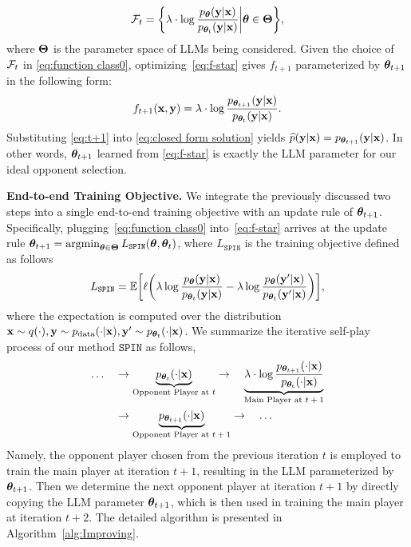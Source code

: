 \documentclass{article}
\newcommand{\method}{\texttt{SPIN}}
\begin{document}
\begin{align}
\mathcal{F}_{t} = \bigg\{\lambda\cdot \log \frac{p_{\bm{\theta}}(\mathbf{y} | \mathbf{x})}{p_{\mathrm{\bm{\theta}_t}}(\mathbf{y} | \mathbf{x})}\bigg|\bm{\theta} \in \bm{\Theta}\bigg\},   \label{eq:function class0} 
\end{align}
where $\bm{\Theta}$ is the parameter space of LLMs being considered. 
Given the choice of $\mathcal{F}_t$ in \eqref{eq:function class0}, optimizing~\eqref{eq:f-star} gives $f_{t+1}$ parameterized by $\bm{\theta}_{t+1}$ in the following form:
\begin{align}
f_{t+1}(\mathbf{x}, \mathbf{y}) = \lambda\cdot \log \frac{p_{\bm{\theta}_{t+1}}(\mathbf{y} | \mathbf{x})}{p_{\mathrm{\bm{\theta}_{t}}}(\mathbf{y} | \mathbf{x})}.    \label{eq:t+1}
\end{align}
Substituting \eqref{eq:t+1} into \eqref{eq:closed form solution} yields $\widehat{p}(\mathbf{y}|\mathbf{x}) = p_{\bm{\theta}_{t+1}}(\mathbf{y}|\mathbf{x})$. 
In other words, $\bm{\theta}_{t+1}$ learned from \eqref{eq:f-star} is exactly the LLM parameter for our ideal opponent selection. 




\noindent \textbf{End-to-end Training Objective.} 
We integrate the previously discussed two steps into a single end-to-end training objective with an update rule of $\bm{\theta}_{t+1}$. Specifically, plugging~\eqref{eq:function class0} into~\eqref{eq:f-star} arrives at the update rule $\btheta_{t+1} = \argmin_{\btheta \in \bTheta}L_{\method}(\btheta, \btheta_t)$, where $L_{\method}$ is the training objective defined as follows
\begin{align}
L_{\method}= \EE\bigg[\ell\bigg(\lambda \log \frac{p_{\btheta}(\yb | \xb)}{p_{\btheta_t}(\yb | \xb)}-\lambda \log \frac{p_{\btheta}(\yb' | \xb)}{p_{\btheta_t}(\yb' | \xb)}\bigg)\bigg], \label{eq:loss}  
\end{align}
where the expectation is computed over the distribution $\mathbf{x} \sim q(\cdot), \mathbf{y} \sim p_{\mathrm{data}}(\cdot|\mathbf{x}), \mathbf{y}' \sim p_{\bm{\theta}_t}(\cdot|\mathbf{x})$.
We summarize the iterative self-play process of our method $\method$ as follows, 
\begin{align*}
\ldots &\quad  \rightarrow  \underbrace{p_{\bm{\theta}_{t}}(\cdot | \mathbf{x})}_{\text{Opponent Player at $t$}} \rightarrow  \quad \underbrace{\lambda\cdot \log \frac{p_{\bm{\theta}_{t+1}}(\cdot | \mathbf{x})}{p_{\mathrm{\bm{\theta}_{t}}}(\cdot | \mathbf{x})}}_{\text{Main Player at $t+1$}} \\
&\quad \rightarrow \underbrace{p_{\bm{\theta}_{t+1}}(\cdot | \mathbf{x})}_{\text{Opponent Player at $t+1$} } \rightarrow \quad \ldots 
\end{align*}
Namely, the opponent player chosen from the previous iteration $t$ is employed to train the main player at iteration $t+1$, resulting in the LLM parameterized by $\bm{\theta}_{t+1}$. Then we determine the next opponent player at iteration $t+1$ by directly copying the LLM parameter $\bm{\theta}_{t+1}$, which is then used in training the main player at iteration $t+2$.
The detailed algorithm is presented in Algorithm~\ref{alg:Improving}. 
\end{document}
